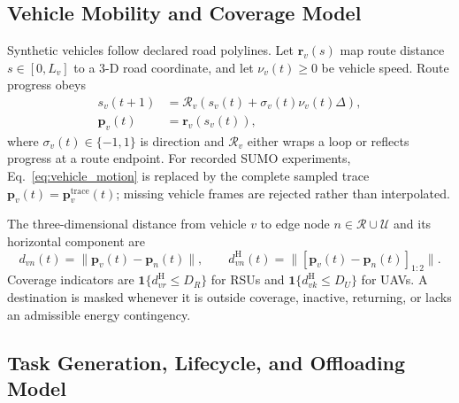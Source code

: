 \subsection{Vehicle Mobility and Coverage Model}
Synthetic vehicles follow declared road polylines. Let
$\boldsymbol r_v(s)$ map route distance $s\in[0,L_v]$ to a 3-D road
coordinate, and let $\nu_v(t)\ge0$ be vehicle speed. Route progress obeys
\begin{equation}
\begin{aligned}
s_v(t+1)&=\mathscr R_v\!\left(
s_v(t)+\sigma_v(t)\nu_v(t)\Delta\right),\\
\boldsymbol p_v(t)&=\boldsymbol r_v(s_v(t)),
\end{aligned}
\label{eq:vehicle_motion}
\end{equation}
where $\sigma_v(t)\in\{-1,1\}$ is direction and
$\mathscr R_v$ either wraps a loop or reflects progress at a route
endpoint. For recorded SUMO experiments, Eq.~\eqref{eq:vehicle_motion}
is replaced by the complete sampled trace
$\boldsymbol p_v(t)=\boldsymbol p_v^{\mathrm{trace}}(t)$; missing
vehicle frames are rejected rather than interpolated.

The three-dimensional distance from vehicle $v$ to edge node
$n\in\mathcal R\cup\mathcal U$ and its horizontal component are
\begin{equation}
d_{vn}(t)=\|\boldsymbol p_v(t)-\boldsymbol p_n(t)\|,\qquad
d_{vn}^{\mathrm H}(t)=
\|[\boldsymbol p_v(t)-\boldsymbol p_n(t)]_{1:2}\|.
\label{eq:distances}
\end{equation}
Coverage indicators are
$\mathbf 1\{d_{vr}^{\mathrm H}\le D_R\}$ for RSUs and
$\mathbf 1\{d_{vk}^{\mathrm H}\le D_U\}$ for UAVs. A destination is
masked whenever it is outside coverage, inactive, returning, or lacks
an admissible energy contingency.

\subsection{Task Generation, Lifecycle, and Offloading Model}
\label{subsec:task_model}
